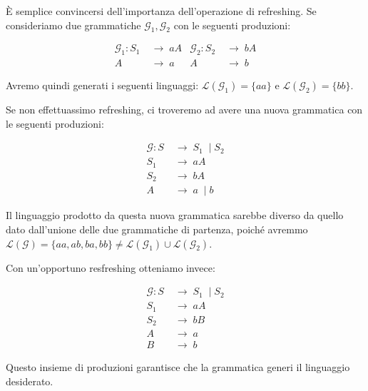 \documentclass[class=book, crop=false, oneside, 12pt]{standalone}
\begin{document}
\begin{osservazione}
  È semplice convincersi dell'importanza dell'operazione di refreshing. Se consideriamo due grammatiche \(\mathcal{G}_1, \mathcal{G}_2\) con le seguenti produzioni:

  \begin{align*}
    \mathcal{G}_1: S_1\; &\to\; aA & \mathcal{G}_2: S_2\; &\to\; bA \\
    A\; &\to\; a & A\; &\to\; b
  \end{align*}

  \noindent Avremo quindi generati i seguenti linguaggi: \(\mathcal{L}(\mathcal{G}_1)  = \{aa\}\) e \(\mathcal{L}(\mathcal{G}_2)  = \{bb\}\).

  Se non effettuassimo refreshing, ci troveremo ad avere una nuova grammatica con le seguenti produzioni:

  \begin{align*}
    \mathcal{G}: S\; &\to\; S_1\; \mid S_2 \\
    S_1\; &\to\; aA \\
    S_2\; &\to\; bA \\
    A\; &\to\; a\; \mid b
  \end{align*}

  \noindent Il linguaggio prodotto da questa nuova grammatica sarebbe diverso da quello dato dall'unione delle due grammatiche di partenza, poiché avremmo \(\mathcal{L(G)} = \{aa, ab, ba, bb\} \neq \mathcal{L}(\mathcal{G}_1)  \cup \mathcal{L}(\mathcal{G}_2) \).

  Con un'opportuno resfreshing otteniamo invece:

  \begin{align*}
    \mathcal{G}: S\; &\to\; S_1\; \mid S_2 \\
    S_1\; &\to\; aA \\
    S_2\; &\to\; bB \\
    A\; &\to\; a \\
    B\; &\to\; b
  \end{align*}

  Questo insieme di produzioni garantisce che la grammatica generi il linguaggio desiderato.
\end{osservazione}
\end{document}
